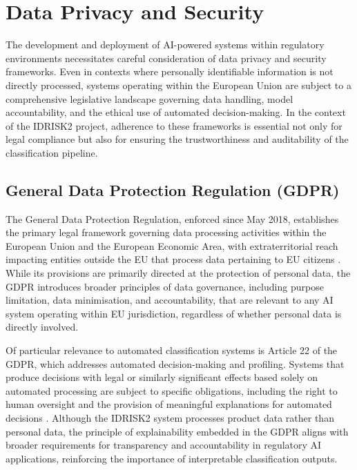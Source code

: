 \hypertarget{data-privacy-and-security}{%
\section{Data Privacy and Security}\label{data-privacy-and-security}}

The development and deployment of AI-powered systems within regulatory environments necessitates careful consideration of data privacy and security frameworks. Even in contexts where personally identifiable information is not directly processed, systems operating within the European Union are subject to a comprehensive legislative landscape governing data handling, model accountability, and the ethical use of automated decision-making. In the context of the IDRISK2 project, adherence to these frameworks is essential not only for legal compliance but also for ensuring the trustworthiness and auditability of the classification pipeline.

\hypertarget{general-data-protection-regulation-gdpr}{%
\subsection{General Data Protection Regulation (GDPR)}\label{general-data-protection-regulation-gdpr}}

The General Data Protection Regulation, enforced since May 2018, establishes the primary legal framework governing data processing activities within the European Union and the European Economic Area, with extraterritorial reach impacting entities outside the EU that process data pertaining to EU citizens \parencite{salvatore_sapienza_0b06a4a0}. While its provisions are primarily directed at the protection of personal data, the GDPR introduces broader principles of data governance, including purpose limitation, data minimisation, and accountability, that are relevant to any AI system operating within EU jurisdiction, regardless of whether personal data is directly involved.

Of particular relevance to automated classification systems is Article 22 of the GDPR, which addresses automated decision-making and profiling. Systems that produce decisions with legal or similarly significant effects based solely on automated processing are subject to specific obligations, including the right to human oversight and the provision of meaningful explanations for automated decisions \parencite{tuan_d__pham_cd6a9823}. Although the IDRISK2 system processes product data rather than personal data, the principle of explainability embedded in the GDPR aligns with broader requirements for transparency and accountability in regulatory AI applications, reinforcing the importance of interpretable classification outputs.

